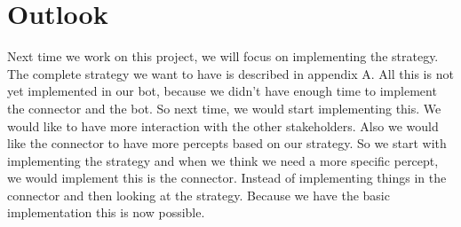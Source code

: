 \section{Outlook}
Next time we work on this project, we will focus on implementing the strategy. The complete strategy we want to have is described in appendix A. All this is not yet implemented in our bot, because we didn't have enough time to implement the connector and the bot. So next time, we would start implementing this. We would like to have more interaction with the other stakeholders. Also we would like the connector to have more percepts based on our strategy. So we start with implementing the strategy and when we think we need a more specific percept, we would implement this is the connector. Instead of implementing things in the connector and then looking at the strategy. Because we have the basic implementation this is now possible.